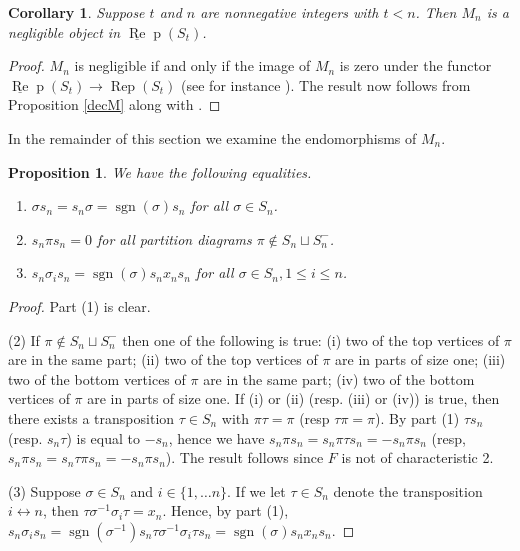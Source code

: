 \documentclass[12pt, reqno]{amsart}
\newtheorem{proposition}[theorem]{Proposition}
\newtheorem{corollary}[theorem]{Corollary}
\theoremstyle{definition}
\def\uRep{\underline{\operatorname{Re}}\!\operatorname{p}}
\newcommand{\Rep}{\operatorname{Rep}}
\renewcommand{\1}{_{(1)}}
\renewcommand{\2}{_{(2)}}
\newcommand{\3}{_{(3)}}
\newcommand{\4}{_{(4)}}
\newcommand{\sgn}{\operatorname{sgn}}
\begin{document}
\begin{corollary}\label{Mneg} Suppose $t$ and $n$ are nonnegative integers with $t<n$.  Then $M_n$ is a negligible object in $\uRep(S_t)$.
\end{corollary}

\begin{proof} $M_n$ is negligible if and only if the image of $M_n$ is zero under the functor $\uRep(S_t)\to\Rep(S_t)$ (see for instance \cite[Theorem 3.24]{CO1}).  The result now follows from Proposition \ref{decM} along with \cite[Proposition 3.25]{CO1}.
\end{proof}

In the remainder of this section we examine the endomorphisms of $M_n$.  


\begin{proposition}\label{snprop} We have the following equalities.

\begin{enumerate}
\item $\sigma s_n=s_n\sigma=\sgn(\sigma)s_n$ for all $\sigma\in S_n$. 
\item  $s_n\pi s_n=0$ for all partition diagrams $\pi\not\in S_n\sqcup S_n^-$. 
\item  $s_n\sigma_i s_n=\sgn(\sigma)s_nx_n s_n$ for all $\sigma\in S_n, 1\leq i\leq n$.
\end{enumerate}
\end{proposition}

\begin{proof} Part (1) is clear.

(2) If $\pi\not\in S_n\sqcup S_n^-$ then one of the following is true:  (i) two of the top vertices of $\pi$ are in the same part; (ii) two of the top vertices of $\pi$ are in parts of size one; (iii) two of the bottom vertices of $\pi$ are in the same part; (iv) two of the bottom vertices of $\pi$ are in parts of size one.  If (i) or (ii) (resp. (iii) or (iv)) is true, then there exists a transposition $\tau\in S_n$ with $\pi\tau=\pi$ (resp $\tau\pi=\pi$).  By part (1) $\tau s_n$ (resp. $s_n\tau$) is equal to $-s_n$, hence we have   $s_n\pi s_n=s_n\pi\tau s_n=-s_n\pi s_n$ (resp, $s_n\pi s_n=s_n\tau\pi s_n=-s_n\pi s_n$).  The result follows since $F$ is not of characteristic 2.

(3) Suppose $\sigma\in S_n$ and $i\in\{1,\ldots n\}$.  If we let $\tau\in S_n$ denote the transposition $i\leftrightarrow n$, then $\tau\sigma^{-1}\sigma_i\tau=x_n$.  Hence, by part (1),  $s_n\sigma_i s_n=\sgn(\sigma^{-1})s_n\tau\sigma^{-1}\sigma_i\tau s_n=\sgn(\sigma)s_nx_n s_n$.
\end{proof}
\end{document}
